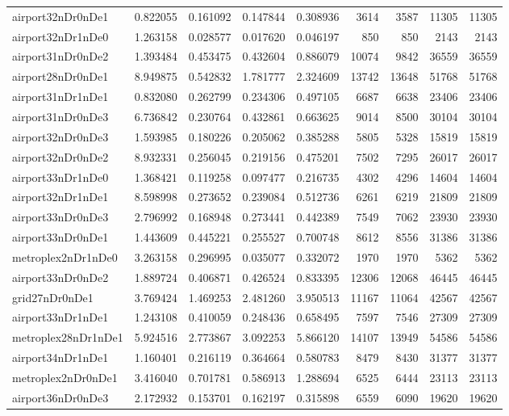 \begin{longtable}{|l|r|r|r|r|r|r|r|r|}
airport32nDr0nDe1 & 0.822055 & 0.161092 & 0.147844 & 0.308936 & 3614 & 3587 & 11305 & 11305 \\
airport32nDr1nDe0 & 1.263158 & 0.028577 & 0.017620 & 0.046197 & 850 & 850 & 2143 & 2143 \\
airport31nDr0nDe2 & 1.393484 & 0.453475 & 0.432604 & 0.886079 & 10074 & 9842 & 36559 & 36559 \\
airport28nDr0nDe1 & 8.949875 & 0.542832 & 1.781777 & 2.324609 & 13742 & 13648 & 51768 & 51768 \\
airport31nDr1nDe1 & 0.832080 & 0.262799 & 0.234306 & 0.497105 & 6687 & 6638 & 23406 & 23406 \\
airport31nDr0nDe3 & 6.736842 & 0.230764 & 0.432861 & 0.663625 & 9014 & 8500 & 30104 & 30104 \\
airport32nDr0nDe3 & 1.593985 & 0.180226 & 0.205062 & 0.385288 & 5805 & 5328 & 15819 & 15819 \\
airport32nDr0nDe2 & 8.932331 & 0.256045 & 0.219156 & 0.475201 & 7502 & 7295 & 26017 & 26017 \\
airport33nDr1nDe0 & 1.368421 & 0.119258 & 0.097477 & 0.216735 & 4302 & 4296 & 14604 & 14604 \\
airport32nDr1nDe1 & 8.598998 & 0.273652 & 0.239084 & 0.512736 & 6261 & 6219 & 21809 & 21809 \\
airport33nDr0nDe3 & 2.796992 & 0.168948 & 0.273441 & 0.442389 & 7549 & 7062 & 23930 & 23930 \\
airport33nDr0nDe1 & 1.443609 & 0.445221 & 0.255527 & 0.700748 & 8612 & 8556 & 31386 & 31386 \\
metroplex2nDr1nDe0 & 3.263158 & 0.296995 & 0.035077 & 0.332072 & 1970 & 1970 & 5362 & 5362 \\
airport33nDr0nDe2 & 1.889724 & 0.406871 & 0.426524 & 0.833395 & 12306 & 12068 & 46445 & 46445 \\
grid27nDr0nDe1 & 3.769424 & 1.469253 & 2.481260 & 3.950513 & 11167 & 11064 & 42567 & 42567 \\
airport33nDr1nDe1 & 1.243108 & 0.410059 & 0.248436 & 0.658495 & 7597 & 7546 & 27309 & 27309 \\
metroplex28nDr1nDe1 & 5.924516 & 2.773867 & 3.092253 & 5.866120 & 14107 & 13949 & 54586 & 54586 \\
airport34nDr1nDe1 & 1.160401 & 0.216119 & 0.364664 & 0.580783 & 8479 & 8430 & 31377 & 31377 \\
metroplex2nDr0nDe1 & 3.416040 & 0.701781 & 0.586913 & 1.288694 & 6525 & 6444 & 23113 & 23113 \\
airport36nDr0nDe3 & 2.172932 & 0.153701 & 0.162197 & 0.315898 & 6559 & 6090 & 19620 & 19620 \\

\end{longtable}
